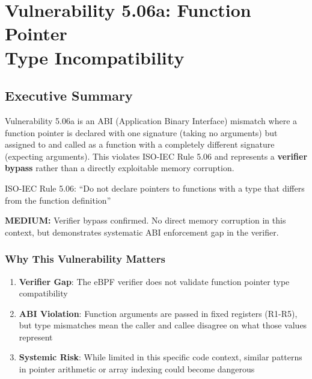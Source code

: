 \chapter{\texorpdfstring{Vulnerability 5.06a: Function Pointer\\Type Incompatibility}{Vulnerability 5.06a: Function Pointer Type Incompatibility}}

\section{Executive Summary}

Vulnerability 5.06a is an ABI (Application Binary Interface) mismatch where a function pointer is declared with one signature (taking no arguments) but assigned to and called as a function with a completely different signature (expecting arguments). This violates ISO-IEC Rule 5.06 and represents a \textbf{verifier bypass} rather than a directly exploitable memory corruption.

\begin{tcolorbox}[colback=blue!5!white,colframe=blue!75!black,title=ISO Rule Violated,fonttitle=\bfseries]
ISO-IEC Rule 5.06: ``Do not declare pointers to functions with a type that differs from the function definition''
\end{tcolorbox}

\begin{tcolorbox}[colback=yellow!5!white,colframe=orange!75!black,title=Severity,fonttitle=\bfseries]
\textbf{MEDIUM:} Verifier bypass confirmed. No direct memory corruption in this context, but demonstrates systematic ABI enforcement gap in the verifier.
\end{tcolorbox}

\subsection{Why This Vulnerability Matters}

\begin{enumerate}[label=\arabic*.]
  \item \textbf{Verifier Gap}: The eBPF verifier does not validate function pointer type compatibility
  \item \textbf{ABI Violation}: Function arguments are passed in fixed registers (R1-R5), but type mismatches mean the caller and callee disagree on what those values represent
  \item \textbf{Systemic Risk}: While limited in this specific code context, similar patterns in pointer arithmetic or array indexing could become dangerous
\end{enumerate}

